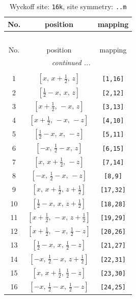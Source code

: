 \documentclass[fleqn,8pt]{jsarticle}
\begin{document}
\renewcommand{\arraystretch}{1.2}
\begin{longtable}{ccc}
\caption{Wyckoff site: {\tt 16k}, site symmetry: {\tt ..m}}
 \\
 \hline \hline
No. & position & mapping \\ \hline \endfirsthead

\multicolumn{2}{l}{\tablename\ \thetable{}} \\
 \hline \hline
No. & position & mapping \\ \hline \endhead

 \hline \hline
\multicolumn{2}{r}{\footnotesize\it continued ...} \\ \endfoot

 \hline \hline
\multicolumn{2}{r}{} \\ \endlastfoot

1 & $\left[ x,\, x + \frac{1}{2},\, z \right]$ & {\tt [1,16]} \\ \hline
2 & $\left[ \frac{1}{2} - x,\, x,\, z \right]$ & {\tt [2,12]} \\ \hline
3 & $\left[ x + \frac{1}{2},\, - x,\, z \right]$ & {\tt [3,13]} \\ \hline
4 & $\left[ x + \frac{1}{2},\, - x,\, - z \right]$ & {\tt [4,10]} \\ \hline
5 & $\left[ \frac{1}{2} - x,\, x,\, - z \right]$ & {\tt [5,11]} \\ \hline
6 & $\left[ - x,\, \frac{1}{2} - x,\, z \right]$ & {\tt [6,15]} \\ \hline
7 & $\left[ x,\, x + \frac{1}{2},\, - z \right]$ & {\tt [7,14]} \\ \hline
8 & $\left[ - x,\, \frac{1}{2} - x,\, - z \right]$ & {\tt [8,9]} \\ \hline
9 & $\left[ x,\, x + \frac{1}{2},\, z + \frac{1}{2} \right]$ & {\tt [17,32]} \\ \hline
10 & $\left[ \frac{1}{2} - x,\, x,\, z + \frac{1}{2} \right]$ & {\tt [18,28]} \\ \hline
11 & $\left[ x + \frac{1}{2},\, - x,\, z + \frac{1}{2} \right]$ & {\tt [19,29]} \\ \hline
12 & $\left[ x + \frac{1}{2},\, - x,\, \frac{1}{2} - z \right]$ & {\tt [20,26]} \\ \hline
13 & $\left[ \frac{1}{2} - x,\, x,\, \frac{1}{2} - z \right]$ & {\tt [21,27]} \\ \hline
14 & $\left[ - x,\, \frac{1}{2} - x,\, z + \frac{1}{2} \right]$ & {\tt [22,31]} \\ \hline
15 & $\left[ x,\, x + \frac{1}{2},\, \frac{1}{2} - z \right]$ & {\tt [23,30]} \\ \hline
16 & $\left[ - x,\, \frac{1}{2} - x,\, \frac{1}{2} - z \right]$ & {\tt [24,25]} \\
\end{longtable}
\end{document}

